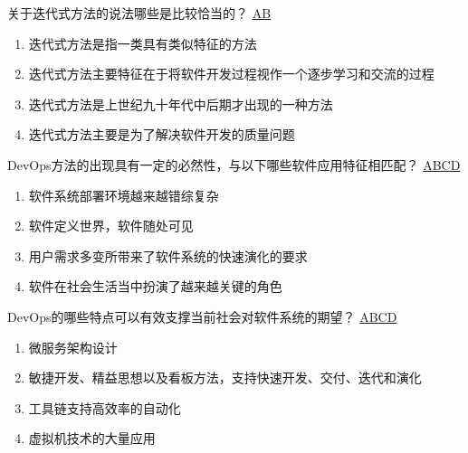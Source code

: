 \begin{problem}
    ‌关于迭代式方法的说法哪些是比较恰当的？
    \uline{AB}    
        \begin{enumerate}[label=\Alph*.]
            \item 迭代式方法是指一类具有类似特征的方法
            \item 迭代式方法主要特征在于将软件开发过程视作一个逐步学习和交流的过程
            \item 迭代式方法是上世纪九十年代中后期才出现的一种方法
            \item 迭代式方法主要是为了解决软件开发的质量问题
        \end{enumerate}
\end{problem}



\begin{problem}
    DevOps方法的出现具有一定的必然性，与以下哪些软件应用特征相匹配？
    \uline{ABCD}    
        \begin{enumerate}[label=\Alph*.]
            \item 软件系统部署环境越来越错综复杂
            \item 软件定义世界，软件随处可见
            \item 用户需求多变所带来了软件系统的快速演化的要求
            \item 软件在社会生活当中扮演了越来越关键的角色
        \end{enumerate}
\end{problem}



\begin{problem}
    DevOps的哪些特点可以有效支撑当前社会对软件系统的期望？
    \uline{ABCD}    
        \begin{enumerate}[label=\Alph*.]
            \item 微服务架构设计
            \item 敏捷开发、精益思想以及看板方法，支持快速开发、交付、迭代和演化
            \item 工具链支持高效率的自动化
            \item 虚拟机技术的大量应用
        \end{enumerate}
\end{problem}



